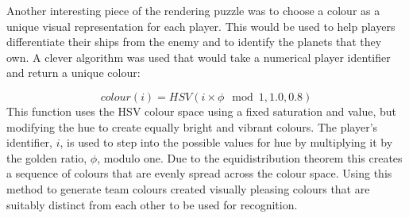 
Another interesting piece of the rendering puzzle was to choose a colour as a unique visual representation for each player. This would be used to help players differentiate their ships from the enemy and to identify the planets that they own. A clever algorithm was used that would take a numerical player identifier and return a unique colour:\cite{ankerl2009}

\begin{equation*}
	colour(i) = HSV(i \times \phi \mod 1, 1.0, 0.8)
\end{equation*}
\noindent
This function uses the HSV colour space using a fixed saturation and value, but modifying the hue to create equally bright and vibrant colours. The player's identifier, $i$, is used to step into the possible values for hue by multiplying it by the golden ratio, $\phi$, modulo one. Due to the equidistribution theorem this creates a sequence of colours that are evenly spread across the colour space. Using this method to generate team colours created visually pleasing colours that are suitably distinct from each other to be used for recognition.
